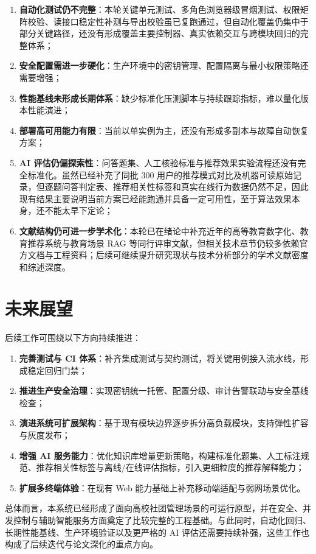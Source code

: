 \begin{enumerate}
  \item \textbf{自动化测试仍不完整}：本轮关键单元测试、多角色浏览器级冒烟测试、权限矩阵校验、读接口稳定性补测与导出校验虽已复跑通过，但自动化覆盖仍集中于部分关键路径，还没有形成覆盖主要控制器、真实依赖交互与跨模块回归的完整体系；
  \item \textbf{安全配置需进一步硬化}：生产环境中的密钥管理、配置隔离与最小权限策略还需要增强；
  \item \textbf{性能基线未形成长期体系}：缺少标准化压测脚本与持续跟踪指标，难以量化版本性能演进；
  \item \textbf{部署高可用能力有限}：当前以单实例为主，还没有形成多副本与故障自动恢复方案；
  \item \textbf{AI 评估仍偏探索性}：问答题集、人工核验标准与推荐效果实验流程还没有完全标准化。虽然已经补充了同批 300 用户的推荐模式对比及机器可读原始记录，但逐题问答判定表、推荐相关性标签和真实在线行为数据仍然不足，因此现有结果主要说明当前方案已经能跑通并具备一定可用性，至于算法效果本身，还不能太早下定论；
  \item \textbf{文献结构仍可进一步学术化}：本轮已在绪论中补充近年的高等教育数字化、教育推荐系统与教育场景 RAG 等同行评审文献，但相关技术章节仍较多依赖官方文档与工程资料；后续可继续提升研究现状与技术分析部分的学术文献密度和综述深度。
\end{enumerate}

\section{未来展望}

后续工作可围绕以下方向持续推进：

\begin{enumerate}
  \item \textbf{完善测试与 CI 体系}：补齐集成测试与契约测试，将关键用例接入流水线，形成稳定回归门禁；
  \item \textbf{推进生产安全治理}：实现密钥统一托管、配置分级、审计告警联动与安全基线检查；
  \item \textbf{演进系统可扩展架构}：基于现有模块边界逐步拆分高负载模块，支持弹性扩容与灰度发布；
  \item \textbf{增强 AI 服务能力}：优化知识库增量更新策略，构建标准化题集、人工标注规范、推荐相关性标签与离线/在线评估指标，引入更细粒度的推荐解释能力；
  \item \textbf{扩展多终端体验}：在现有 Web 能力基础上补充移动端适配与弱网场景优化。
\end{enumerate}

总体而言，本系统已经形成了面向高校社团管理场景的可运行原型，并在安全、并发控制与辅助智能服务方面奠定了比较完整的工程基础。与此同时，自动化回归、长期性能基线、生产环境验证以及更严格的 AI 评估还需要持续补强，这些工作也构成了后续迭代与论文深化的重点方向。



